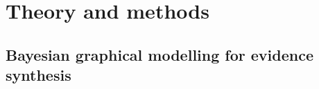 \documentclass[12pt]{article}\usepackage[]{graphicx}\usepackage[]{color}
\begin{document}













\section{Theory and methods}
\label{sec:meth}

\subsection{Bayesian graphical modelling for evidence synthesis}
\end{document}
